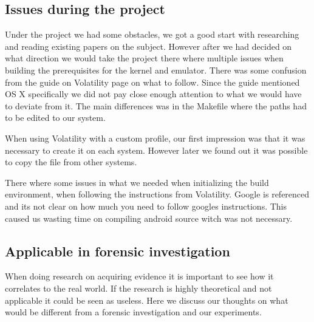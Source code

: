 \subsection{Issues during the project}
Under the project we had some obstacles, we got a good start with researching and 
reading existing papers on the subject. However after we had decided on what 
direction we would take the project there where multiple issues when building the 
prerequisites for the kernel and emulator. There was some confusion from the guide 
on Volatility page on what to follow. Since the guide mentioned OS X specifically 
we did not pay close enough attention to what we would have to deviate from it.
The main differences was in the Makefile where the paths had to be edited to our
system.

When using Volatility with a custom profile, our first impression was that it was
necessary to create it on each system. However later we found out it was possible 
to copy the file from other systems.

There where some issues in what we needed when initializing the build environment, when 
following the instructions from Volatility. Google is referenced and its not clear 
on how much you need to follow googles instructions. This caused us wasting time 
on compiling android source witch was not necessary.


\subsection{Applicable in forensic investigation}
When doing research on acquiring evidence it is important to see how it correlates 
to the real world. If the research is highly theoretical and not applicable it 
could be seen as useless. Here we discuss our thoughts on what would be different 
from a forensic investigation and our experiments.
